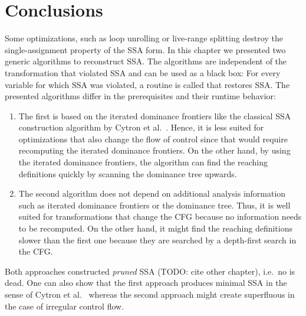 \section{Conclusions}

Some optimizations, such as loop unrolling or live-range splitting destroy the single-assignment property of the SSA form.
In this chapter we presented two generic algorithms to reconstruct SSA.
The algorithms are independent of the transformation that violated SSA and can be used as a black box:
For every variable for which SSA was violated, a routine is called that restores SSA.
The presented algorithms differ in the prerequisites and their runtime behavior:
\begin{enumerate}
	\item 
		The first is based on the iterated dominance frontiers like the classical SSA construction algorithm by Cytron et al.~\cite{cytron:1991:ssa}.
		Hence, it is less suited for optimizations that also change the flow of control since that would require recomputing the iterated dominance frontiers.
		On the other hand, by using the iterated dominance frontiers, the algorithm can find the reaching definitions quickly by scanning the dominance tree upwards.
	\item 
		The second algorithm does not depend on additional analysis information such as iterated dominance frontiers or the dominance tree.
		Thus, it is well suited for transformations that change the CFG because no information needs to be recomputed.
		On the other hand, it might find the reaching definitions slower than the first one because they are searched by a depth-first search in the CFG.
\end{enumerate}
Both approaches constructed \emph{pruned} SSA (TODO: cite other chapter), i.e.~no \phifun is dead. 
One can also show that the first approach produces minimal SSA in the sense of Cytron et al.~\cite{cytron:1991:ssa} whereas the second approach might create superfluous \phifuns in the case of irregular control flow.
